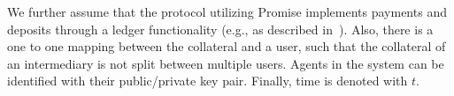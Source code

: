 \documentclass[runningheads]{llncs}
\newcommand{\sys}{Promise\xspace}
\begin{document}
We further assume that the protocol utilizing \sys implements payments and deposits through a ledger functionality (e.g., as described in~\cite{garay2016bitcoin}). 
Also, there is a one to one mapping between the collateral and a user, such that the collateral of an intermediary is not split between multiple users.
Agents in the system can be identified with their public/private key pair.
Finally, time is denoted with $t$. 



\end{document}
